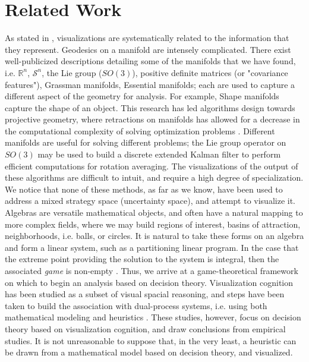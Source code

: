 \documentclass[11pt]{article}
\theoremstyle{definition}
\newcommand{\mcS}{\mathcal{S}}
\begin{document}
\section{Related Work}

As stated in \cite{VIS},
visualizations are systematically related to the information that they represent. 
Geodesics on a manifold are intensely complicated. 
There exist well-publicized descriptions detailing some of the
manifolds that we have found, i.e. $\mathbb{R}^n$, $\mcS^n$, the Lie group
($SO(3)$), positive definite matrices (or "covariance features"), Grassman
manifolds, Essential manifolds; each are used to capture a different aspect of
the geometry for analysis. For example, Shape manifolds capture the shape of an object. This
research has led algorithms design towards projective geometry, where retractions on
manifolds has allowed for a decrease in the computational complexity of solving
optimization problems \cite{MECH}. Different manifolds are useful
for solving different problems; the Lie group operator on $SO(3)$ may be used to
build a discrete extended Kalman filter to perform efficient computations
for rotation averaging. The visualizations of the output of these algorithms
are difficult to intuit, and require a high degree of specialization. We notice 
that none of these methods, as far as we know,
have been used to address a mixed strategy space (uncertainty space), and attempt to
visualize it. Algebras are versatile mathematical objects, and often
have a natural mapping to more complex fields, where we may build
regions of interest, basins of attraction, neighborhoods, i.e. balls, or
circles. 
It is natural to take these forms on an algebra and form a linear
system, such as a partitioning linear program. In the case that the
extreme point providing the solution to the system is integral, then the
associated \emph{game} is non-empty \cite{FAIR}. 
Thus, we arrive at a game-theoretical framework on which to begin an
analysis based on decision theory. Visualization cognition has been
studied as a subset of visual spacial reasoning, and steps have been
taken to build the association with dual-process systems, i.e. using both
mathematical modeling and heuristics \cite{VIS}. These
studies, however, focus on decision theory based on visualization
cognition, and draw conclusions from empirical studies. It is not
unreasonable to suppose that, in the very least, a
heuristic can be drawn from a mathematical model based on decision theory, and visualized.
\end{document}
